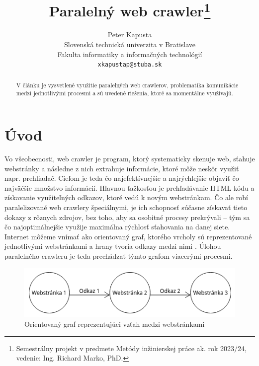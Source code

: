 \documentclass[10pt,twoside,slovak,a4paper]{article}
\title{Paralelný web crawler\thanks{Semestrálny projekt v predmete Metódy inžinierskej práce ak. rok 2023/24, vedenie: Ing. Richard Marko, PhD.}}
\author{Peter Kapusta \\
	\small Slovenská technická univerzita v Bratislave \\
	\small Fakulta informatiky a informačných technológií \\
	\small \texttt{xkapustap@stuba.sk}
}
\begin{document}
\maketitle

\begin{abstract}
V článku je vysvetlené využitie paralelných web crawlerov, problematika komunikácie medzi jednotlivými procesmi a sú uvedené riešenia, ktoré sa momentálne využívajú.
\end{abstract}

\section{Úvod}

Vo všeobecnosti, web crawler je program, ktorý systematicky skenuje web, sťahuje webstránky a následne z nich extrahuje informácie, ktoré môže neskôr využiť napr. prehliadač. Cieľom je teda čo najefektívnejšie a najrýchlejšie objaviť čo najväčšie množstvo informácií. Hlavnou ťažkosťou je prehľadávanie HTML kódu a získavanie využiteľných odkazov, ktoré vedú k novým webstránkam. Čo ale robí paralelizované web crawlery špeciálnymi, je ich schopnosť súčasne získavať tieto dokazy z rôznych zdrojov, bez toho, aby sa osobitné procesy prekrývali – tým sa čo najoptimálnejšie využije maximálna rýchlosť sťahovania na danej siete. Internet môžeme vnímať ako orientovaný graf, ktorého vrcholy sú reprezentované jednotlivými webstránkami a hrany tvoria odkazy medzi nimi \cite{7148493}. Úlohou paralelného crawleru je teda prechádzať týmto grafom viacerými procesmi.

\newpage

\begin{figure}
	\includegraphics[width=\textwidth]{diagram1.png}
	\caption{Orientovaný graf reprezentujúci vzťah medzi webstránkami}
\end{figure}
\end{document}
